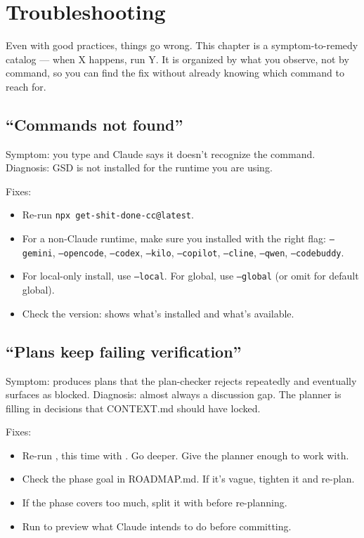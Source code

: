 \documentclass[11pt,letterpaper,openany]{book}
\begin{document}
\chapter{Troubleshooting}

Even with good practices, things go wrong. This chapter is a symptom-to-remedy catalog --- when X happens, run Y. It is organized by what you observe, not by command, so you can find the fix without already knowing which command to reach for.

\section{``Commands not found''}

Symptom: you type  and Claude says it doesn't recognize the command. Diagnosis: GSD is not installed for the runtime you are using.

Fixes:
\begin{itemize}[itemsep=2pt]
  \item Re-run \texttt{npx get-shit-done-cc@latest}.
  \item For a non-Claude runtime, make sure you installed with the right flag: \texttt{--gemini}, \texttt{--opencode}, \texttt{--codex}, \texttt{--kilo}, \texttt{--copilot}, \texttt{--cline}, \texttt{--qwen}, \texttt{--codebuddy}.
  \item For local-only install, use \texttt{--local}. For global, use \texttt{--global} (or omit for default global).
  \item Check the version:  shows what's installed and what's available.
\end{itemize}

\section{``Plans keep failing verification''}

Symptom:  produces plans that the plan-checker rejects repeatedly and eventually surfaces as blocked. Diagnosis: almost always a discussion gap. The planner is filling in decisions that CONTEXT.md should have locked.

Fixes:
\begin{itemize}[itemsep=2pt]
  \item Re-run , this time with . Go deeper. Give the planner enough to work with.
  \item Check the phase goal in ROADMAP.md. If it's vague, tighten it and re-plan.
  \item If the phase covers too much, split it with  before re-planning.
  \item Run  to preview what Claude intends to do before committing.
\end{itemize}
\end{document}
